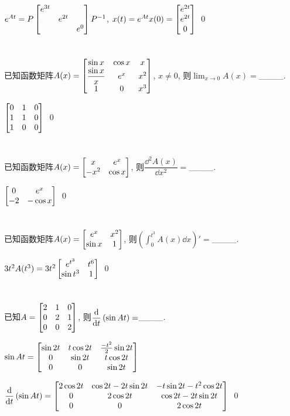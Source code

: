 \documentclass{matrix-homework}
\begin{document}
$e^{At}=P\begin{bmatrix}e^{3t}\\&e^{2t}\\&&e^0\end{bmatrix}P^{-1}$, $x(t)=e^{At}x(0)=\begin{bmatrix}e^{2t}\\e^{2t}\\0\end{bmatrix}$
\qed


\section{}
已知函数矩阵$A(x)=\begin{bmatrix}\sin x & \cos x & x \\ \dfrac{\sin x}{x} & e^x & x^2 \\ 1 & 0 & x^3\end{bmatrix}$, $x\ne 0$, 则$\lim_{x\to 0}A(x)=$\_\_\_\_.

\answer
$\begin{bmatrix}0 & 1 & 0 \\ 1 & 1 & 0 \\ 1 & 0 & 0\end{bmatrix}$
\qed


\section{}
已知函数矩阵$A(x)=\begin{bmatrix}x & e^x \\ -x^2 & \cos x\end{bmatrix}$, 则$\dfrac{\dd^2A(x)}{\dd x^2}=$\_\_\_\_.

\answer
$\begin{bmatrix}0 & e^x \\ -2 & -\cos x\end{bmatrix}$
\qed


\section{}
已知函数矩阵$A(x)=\begin{bmatrix}e^x & x^2 \\ \sin x & 1\end{bmatrix}$, 则$\displaystyle\left(\int_{0}^{t^3}A(x)\dd x\right)'=$\_\_\_\_.

\answer
$3t^2A(t^3)=3t^2\begin{bmatrix}e^{t^3} & t^6 \\ \sin t^3 & 1\end{bmatrix}$
\qed


\section{}
已知$A=\begin{bmatrix}2&1&0 \\ 0&2&1\\ 0&0&2\end{bmatrix}$, 则$\displaystyle\dfrac{\mathrm{d} }{\mathrm{d} t}\left(\sin At\right)=$\_\_\_\_.

\answer
$\sin At=\begin{bmatrix}\sin 2t & t\cos 2t & \frac{-t^2}{2}\sin 2t \\ 0 & \sin 2t & t\cos 2t \\ 0&0&\sin 2t\end{bmatrix}$

$\displaystyle\dfrac{\mathrm{d} }{\mathrm{d} t}\left(\sin At\right)= \begin{bmatrix}2\cos 2t & \cos 2t -2t\sin 2t & -t\sin 2t - t^2\cos 2t \\ 0 & 2\cos 2t & \cos 2t -2t\sin 2t \\0&0&2\cos 2t\end{bmatrix}$
\qed
\end{document}
